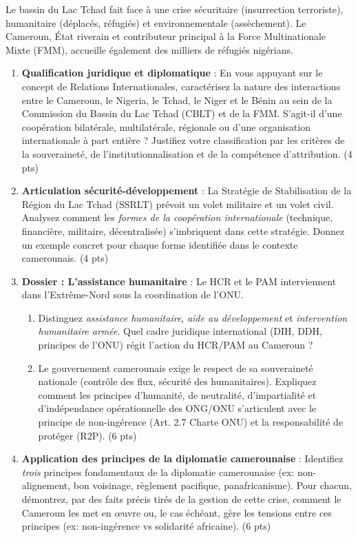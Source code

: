 \documentclass[11pt]{article}
\begin{document}
\begin{exercice}
Le bassin du Lac Tchad fait face à une crise sécuritaire (insurrection terroriste), humanitaire (déplacés, réfugiés) et environnementale (assèchement). Le Cameroun, État riverain et contributeur principal à la Force Multinationale Mixte (FMM), accueille également des milliers de réfugiés nigérians.

\begin{enumerate}
    \item \textbf{Qualification juridique et diplomatique} : En vous appuyant sur le concept de Relations Internationales, caractérisez la nature des interactions entre le Cameroun, le Nigeria, le Tchad, le Niger et le Bénin au sein de la Commission du Bassin du Lac Tchad (CBLT) et de la FMM. S'agit-il d'une coopération bilatérale, multilatérale, régionale ou d'une organisation internationale à part entière ? Justifiez votre classification par les critères de la souveraineté, de l'institutionnalisation et de la compétence d'attribution. (4 pts)
    
    \item \textbf{Articulation sécurité-développement} : La Stratégie de Stabilisation de la Région du Lac Tchad (SSRLT) prévoit un volet militaire et un volet civil. Analysez comment les \textit{formes de la coopération internationale} (technique, financière, militaire, décentralisée) s'imbriquent dans cette stratégie. Donnez un exemple concret pour chaque forme identifiée dans le contexte camerounais. (4 pts)
    
    \item \textbf{Dossier : L'assistance humanitaire} : Le HCR et le PAM interviennent dans l'Extrême-Nord sous la coordination de l'ONU. 
    \begin{enumerate}
        \item Distinguez \textit{assistance humanitaire}, \textit{aide au développement} et \textit{intervention humanitaire armée}. Quel cadre juridique international (DIH, DDH, principes de l'ONU) régit l'action du HCR/PAM au Cameroun ?
        \item Le gouvernement camerounais exige le respect de sa souveraineté nationale (contrôle des flux, sécurité des humanitaires). Expliquez comment les principes d'humanité, de neutralité, d'impartialité et d'indépendance opérationnelle des ONG/ONU s'articulent avec le principe de non-ingérence (Art. 2.7 Charte ONU) et la responsabilité de protéger (R2P). (6 pts)
    \end{enumerate}
    
    \item \textbf{Application des principes de la diplomatie camerounaise} : Identifiez \textit{trois} principes fondamentaux de la diplomatie camerounaise (ex: non-alignement, bon voisinage, règlement pacifique, panafricanisme). Pour chacun, démontrez, par des faits précis tirés de la gestion de cette crise, comment le Cameroun les met en œuvre ou, le cas échéant, gère les tensions entre ces principes (ex: non-ingérence vs solidarité africaine). (6 pts)
\end{enumerate}
\end{exercice}
\end{document}
